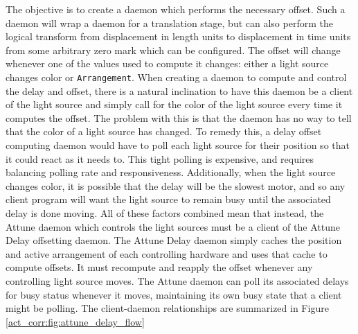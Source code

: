 The objective is to create a daemon which performs the necessary offset.
Such a daemon will wrap a daemon for a translation stage, but can also perform the logical transform from displacement in length units to displacement in time units from some arbitrary zero mark which can be configured.
The offset will change whenever one of the values used to compute it changes: either a light source changes color or \texttt{Arrangement}.
When creating a daemon to compute and control the delay and offset, there is a natural inclination to have this daemon be a client of the light source and simply call for the color of the light source every time it computes the offset.
The problem with this is that the daemon has no way to tell that the color of a light source has changed.
To remedy this, a delay offset computing daemon would have to poll each light source for their position so that it could react as it needs to.
This tight polling is expensive, and requires balancing polling rate and responsiveness.
Additionally, when the light source changes color, it is possible that the delay will be the slowest motor, and so any client program will want the light source to remain busy until the associated delay is done moving.
All of these factors combined mean that instead, the Attune daemon which controls the light sources must be a client of the Attune Delay offsetting daemon.
The Attune Delay daemon simply caches the position and active arrangement of each controlling hardware and uses that cache to compute offsets.
It must recompute and reapply the offset whenever any controlling light source moves.
The Attune daemon can poll its associated delays for busy status whenever it moves, maintaining its own busy state that a client might be polling.
The client-daemon relationships are summarized in Figure \ref{act_corr:fig:attune_delay_flow}

